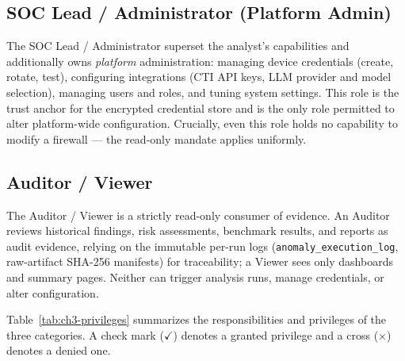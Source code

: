 \subsection{SOC Lead / Administrator (Platform Admin)}
\label{sec:ch3-user-admin}
The SOC Lead / Administrator superset the analyst's capabilities and additionally owns \emph{platform} administration: managing device credentials (create, rotate, test), configuring integrations (CTI API keys, LLM provider and model selection), managing users and roles, and tuning system settings. This role is the trust anchor for the encrypted credential store and is the only role permitted to alter platform-wide configuration. Crucially, even this role holds no capability to modify a firewall — the read-only mandate applies uniformly.

\subsection{Auditor / Viewer}
\label{sec:ch3-user-auditor}
The Auditor / Viewer is a strictly read-only consumer of evidence. An Auditor reviews historical findings, risk assessments, benchmark results, and reports as audit evidence, relying on the immutable per-run logs (\texttt{anomaly\_execution\_log}, raw-artifact SHA-256 manifests) for traceability; a Viewer sees only dashboards and summary pages. Neither can trigger analysis runs, manage credentials, or alter configuration.

Table~\ref{tab:ch3-privileges} summarizes the responsibilities and privileges of the three categories. A check mark ($\checkmark$) denotes a granted privilege and a cross ($\times$) denotes a denied one.

